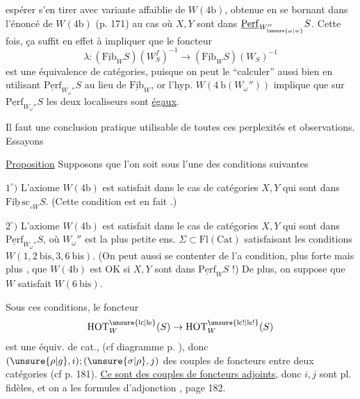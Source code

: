 
espérer s'en tirer avec  variante affaiblie de $W(4\mathrm b)$, obtenue en se bornant dans l'énoncé de $W(4\mathrm b)$ (p. 171) au cas où $X,Y$ sont dans $\underline{\mathrm{Perf}}_{W_{\unsure{\omega|w}}''}S$. Cette fois, ça suffit en effet à impliquer que le foncteur
\[
\lambda:(\underline{\mathrm{Fib}}_W S)(W_S^f)^{-1}\to(\underline{\mathrm{Fib}}_W S)(W_S)^{-1}
\]
est une équivalence de catégories, puisque on peut le ``calculer'' aussi bien en utilisant $\underline{\mathrm{Perf}}_{W_\omega''}S$ au lieu de $\underline{\mathrm{Fib}}_W$, or  l'hyp. $W(4\ \mathrm b(W_\omega''))$ implique que sur $\underline{\mathrm{Perf}}_{W_\omega''}S$ les deux localiseurs  sont \uline{égaux}.

Il faut une conclusion pratique utilisable de toutes ces perplexités et observations. Essayons

\uline{Proposition} Supposons que l'on soit sous l'une des conditions suivantes

$1^\circ)$ L'axiome $W(4\mathrm b)$ est satisfait dans le cas de catégories $X,Y$  qui sont dans $\underline{\mathrm{Fib\,sc}}_{\circ W}S$. (Cette condition  est en fait .)

$2^\circ)$ L'axiome $W(4\mathrm b)$ est satisfait dans le cas de catégories $X,Y$ qui sont dans $\underline{\mathrm{Perf}}_{W_\omega''}S$, où $W_\omega''$ est la plus petite ens. $\Sigma\subset\mathrm{Fl}(\mathrm{Cat})$ satisfaisant les conditions $W(1,2\ \mathrm{bis},3,6\ \mathrm{bis})$. (On peut aussi se contenter de l'a condition, plus forte mais plus , que $W(4\mathrm b)$ est OK si $X,Y$ sont dans $\underline{\mathrm{Perf}}_W S$ !) De plus, on suppose que $W$ satisfait $W(6\ \mathrm{bis})$.

Sous ces conditions, le foncteur 
\[
\mathrm{HOT}_W^{\unsure{\mathrm{lc}|\mathrm{le}}}(S)\to\mathrm{HOT}_W^{\unsure{\mathrm{lc}!|\mathrm{le}!}}(S)
\]
est une équiv. de cat., (cf diagramme p. ), donc $(\unsure{\rho|g},i);(\unsure{\sigma|\rho},j)$   des couples de foncteurs entre deux catégories (cf  p. 181). \uline{Ce sont des couples de foncteurs adjoints}, donc $i,j$ sont pl. fidèles, et on a les formules d'adjonction , page 182.
